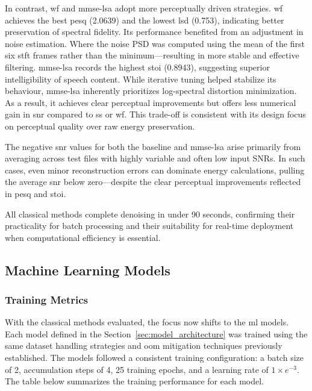 In contrast, \gls{wf} and \gls{mmse-lsa} adopt more perceptually driven strategies. \gls{wf} achieves the best \gls{pesq} (2.0639) and the lowest \gls{lsd} (0.753), indicating better preservation of spectral fidelity. Its performance benefited from an adjustment in noise estimation. Where the noise PSD was computed using the mean of the first six \gls{stft} frames rather than the minimum—resulting in more stable and effective filtering. \gls{mmse-lsa} records the highest \gls{stoi} (0.8943), suggesting superior intelligibility of speech content. While iterative tuning helped stabilize its behaviour, \gls{mmse-lsa} inherently prioritizes log-spectral distortion minimization. As a result, it achieves clear perceptual improvements but offers less numerical gain in \gls{snr} compared to \gls{ss} or \gls{wf}. This trade-off is consistent with its design focus on perceptual quality over raw energy preservation.

The negative \gls{snr} values for both the baseline and \gls{mmse-lsa} arise primarily from averaging across test files with highly variable and often low input SNRs. In such cases, even minor reconstruction errors can dominate energy calculations, pulling the average \gls{snr} below zero—despite the clear perceptual improvements reflected in \gls{pesq} and \gls{stoi}.

All classical methods complete denoising in under 90 seconds, confirming their practicality for batch processing and their suitability for real-time deployment when computational efficiency is essential.

\subsection{Machine Learning Models}
\label{sec:ml_models}

\subsubsection{Training Metrics}
\label{sec:training_metrics}

With the classical methods evaluated, the focus now shifts to the \gls{ml} models. Each model defined in the Section~\ref{sec:model_architecture} was trained using the same dataset handling strategies and \gls{oom} mitigation techniques previously established. The models followed a consistent training configuration: a batch size of 2, accumulation steps of 4, 25 training epochs, and a learning rate of $1 \times e^{-3}$. The table below summarizes the training performance for each model.

